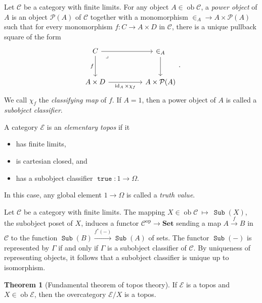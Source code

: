 \documentclass[10pt,letterpaper,cm]{nupset}
\theoremstyle{definition}
\theoremstyle{theorem}
\newtheorem{theorem}[definition]{Theorem}
\theoremstyle{remark}
\renewcommand{\P}{\mathcal P}
\newcommand{\1}{\mathbf{1}}
\renewcommand{\c}{\mathscr{C}}
\newcommand{\e}{\mathscr{E}}
\newcommand{\0}{\vec 0}
\DeclareMathOperator{\id}{id}
\DeclareMathOperator{\true}{\mathtt{true}}
\DeclareMathOperator{\op}{op}
\DeclareMathOperator{\ob}{ob}
\DeclareMathOperator{\sub}{\mathtt{Sub}}
\newcommand{\bi}{\begin{itemize}}
\newcommand{\ei}{\end{itemize}}
\begin{document}
\begin{abstract}
This is a brief introduction to elementary toposes. These play a central role in categorical semantics of dependent type theory (along with other areas of categorical logic). We assume knowledge of basic category theory, and our main source for this material is the $n$Lab.
\end{abstract}

\bigskip

Let $\c$ be a category with finite limits. For any object $A \in \ob{\c}$, a \textit{power object} of $A$ is  an object $\P(A)$ of $\c$ together with a monomorphism $\in_A  \to A \times \P(A)$ such that for every monomorphism $ f: C \to A \times D$ in $\c$, there is a unique pullback square of the form
\[
\begin{tikzcd}[column sep=huge, row sep=large, ampersand replacement=\&]
	C \& \in_A \\
	A \times D \& A \times \P(A)
	\arrow[from=1-2, to=2-2]
	\arrow["f"', from=1-1, to=2-1]
	\arrow["{\id_A \times \chi_f}"', from=2-1, to=2-2]
	\arrow[from=1-1, to=1-2]
	\arrow["\lrcorner"{anchor=center, pos=0.125}, draw=none, from=1-1, to=2-2]
\end{tikzcd}
.\] We call $\chi_f$ the \textit{classifying map} of $f$. If $A = 1$, then a power object of $A$ is called a \textit{subobject classifier}.

\medskip

A category $\e$ is an  \textit{elementary topos} if it
\bi
\item has finite limits,
\item is cartesian closed, and
\item has a subobject classifier $\true : 1 \to \Omega$.
\ei
In this case, any global element $1 \to \Omega$  is called a \textit{truth value}. 

\medskip

Let $\c$ be a category with finite limits. The mapping $X \in \ob{\c} \ \mapsto \ \sub(X)$, the subobject poset of $X$, induces a functor $\c^{\op} \to \mathbf{Set}$ sending a map $A \xrightarrow{f} B$ in $\c$ to the function $\sub(B) \xrightarrow{f^{\ast}({-})} \sub(A)$ of sets. The functor $\sub({-})$ is represented by $\Gamma$ if and only if $\Gamma$ is a subobject classifier of $\c$. By uniqueness of representing objects, it follows that a subobject classifier is unique up to isomorphism.

\begin{theorem}[Fundamental theorem of topos theory]
If $\e$ is a topos and $X \in \ob{\e}$, then the overcategory ${\e}/{X}$ is a topos.
\end{theorem}
\end{document}
